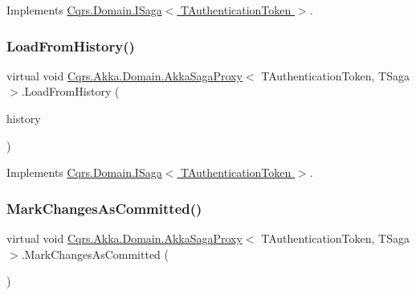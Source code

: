 Implements \hyperlink{interfaceCqrs_1_1Domain_1_1ISaga_abb77811b4f7d19adb61f9d33da18e7e0}{Cqrs.\+Domain.\+I\+Saga$<$ T\+Authentication\+Token $>$}.

\mbox{\label{classCqrs_1_1Akka_1_1Domain_1_1AkkaSagaProxy_a21b69799b046c1fcdf5b2443699dee0c}} 
\subsubsection{\texorpdfstring{Load\+From\+History()}{LoadFromHistory()}}
{\footnotesize\ttfamily virtual void \hyperlink{classCqrs_1_1Akka_1_1Domain_1_1AkkaSagaProxy}{Cqrs.\+Akka.\+Domain.\+Akka\+Saga\+Proxy}$<$ T\+Authentication\+Token, T\+Saga $>$.Load\+From\+History (\begin{DoxyParamCaption}\item[{I\+Enumerable$<$ \hyperlink{interfaceCqrs_1_1Events_1_1ISagaEvent}{I\+Saga\+Event}$<$ T\+Authentication\+Token $>$$>$}]{history }\end{DoxyParamCaption})\hspace{0.3cm}{\ttfamily [virtual]}}



Implements \hyperlink{interfaceCqrs_1_1Domain_1_1ISaga_a2714804684bc65cf4dec79b4697b9b21}{Cqrs.\+Domain.\+I\+Saga$<$ T\+Authentication\+Token $>$}.

\mbox{\label{classCqrs_1_1Akka_1_1Domain_1_1AkkaSagaProxy_a5a5c012bc0f7f957b8bd2298956ca9ae}} 
\subsubsection{\texorpdfstring{Mark\+Changes\+As\+Committed()}{MarkChangesAsCommitted()}}
{\footnotesize\ttfamily virtual void \hyperlink{classCqrs_1_1Akka_1_1Domain_1_1AkkaSagaProxy}{Cqrs.\+Akka.\+Domain.\+Akka\+Saga\+Proxy}$<$ T\+Authentication\+Token, T\+Saga $>$.Mark\+Changes\+As\+Committed (\begin{DoxyParamCaption}{ }\end{DoxyParamCaption})\hspace{0.3cm}{\ttfamily [virtual]}}



